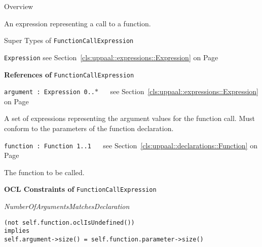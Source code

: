 	\begin{longdescription}
		\item[Overview] 		
				

	

		An expression representing a call to a function.		
		\item[Super Types of \texttt{FunctionCallExpression}] ~
			\begin{longdescription}
				\item[\texttt{Expression}] see Section~\ref{cls:uppaal::expressions::Expression} on Page~\pageref{cls:uppaal::expressions::Expression}						\end{longdescription}
		
	
			\item[\textbf{References of} \texttt{FunctionCallExpression}] ~
			\begin{longdescription}
	\item[\texttt{argument : Expression 	\symbol{"5B}0..$*$\symbol{"5D}
}] ~
	see Section~\ref{cls:uppaal::expressions::Expression} on Page~\pageref{cls:uppaal::expressions::Expression}
	
	\nopagebreak
		
				

	

		A set of expressions representing the argument values for the function call. Must conform to the parameters of the function declaration.		
	\item[\texttt{function : Function 	\symbol{"5B}1..1\symbol{"5D}
}] ~
	see Section~\ref{cls:uppaal::declarations::Function} on Page~\pageref{cls:uppaal::declarations::Function}
	
	\nopagebreak
		
				

	

		The function to be called.		
			\end{longdescription}
			\item[\textbf{OCL Constraints of} \texttt{FunctionCallExpression}] ~
			\begin{longdescription}
	\item[\small\textit{NumberOfArgumentsMatchesDeclaration}] ~ 
	\nopagebreak
	
		\begin{lstlisting}[breaklines=true]
(not self.function.oclIsUndefined())
implies
self.argument->size() = self.function.parameter->size()		\end{lstlisting}
			\end{longdescription}
	
	\end{longdescription}
	

